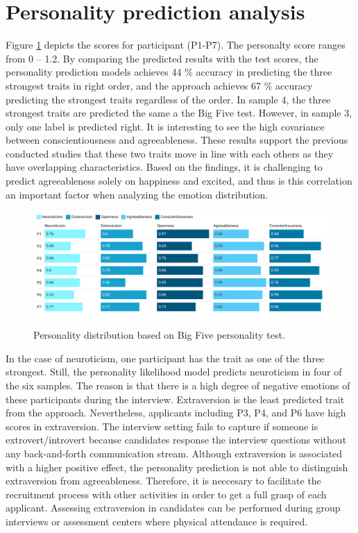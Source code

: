 \section{Personality prediction analysis}
Figure \ref{fig:personality_distribution} depicts the scores for participant (P1-P7). The personalty score ranges from 0 -- 1.2. By comparing the predicted results with the test scores, the personality prediction models achieves 44 \% accuracy in predicting the three strongest traits in right order, and the approach achieves 67 \% accuracy predicting the strongest traits regardless of the order. In sample 4, the three strongest traits are predicted the same a the Big Five test. However, in sample 3, only one label is predicted right. It is interesting to see the high covariance between conscientiousness and agreeableness. These results support the previous conducted studies that these two traits move in line with each others as they have overlapping characteristics. Based on the findings, it is challenging to predict agreeableness solely on happiness and excited, and thus is this correlation an important factor when analyzing the emotion distribution. 
%
\begin{figure}[h]
  \centering
  \includegraphics[width=\textwidth]{figures/personality_dist_all.png}
  \caption{Personality distribution based on Big Five personality test.}
  \label{fig:personality_distribution}
\end{figure}
%
In the case of neuroticism, one participant has the trait as one of the three strongest. Still, the personality likelihood model predicts neuroticism in four of the six samples. The reason is that there is a high degree of negative emotions of these participants during the interview. Extraversion is the least predicted trait from the approach. Nevertheless, applicants including P3, P4, and P6 have high scores in extraversion. The interview setting fails to capture if someone is extrovert/introvert because candidates response the interview questions without any back-and-forth communication stream. Although extraversion is associated with a higher positive effect, the personality prediction is not able to distinguish extraversion from agreeableness. Therefore, it is neccesary to facilitate the recruitment process with other activities in order to get a full grasp of each applicant. Assessing extraversion in candidates can be performed during group interviews or assessment centers where physical attendance is required. 

